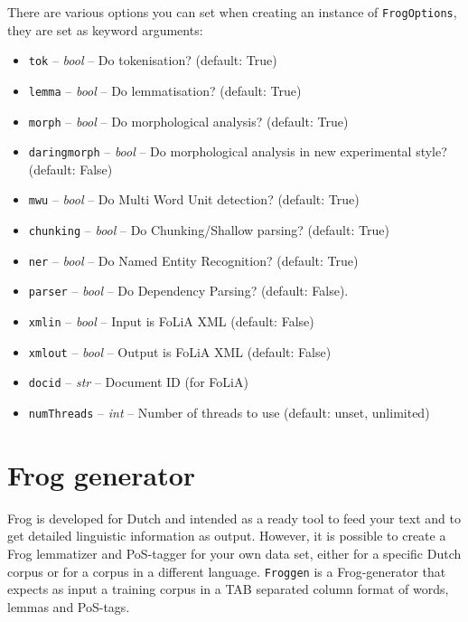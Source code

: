 \documentclass{book}
\begin{document}
There are various options you can set when creating an instance of \texttt{FrogOptions}, they are set as keyword arguments:

\begin{itemize}
	\item \texttt{tok} -- \emph{bool} -- Do tokenisation? (default: True)
	\item \texttt{lemma} -- \emph{bool} -- Do lemmatisation? (default: True)
	\item \texttt{morph} -- \emph{bool} -- Do morphological analysis? (default: True)
	\item \texttt{daringmorph} -- \emph{bool} -- Do morphological analysis in new experimental style? (default: False)
	\item \texttt{mwu} -- \emph{bool} -- Do Multi Word Unit detection? (default: True)
	\item \texttt{chunking} -- \emph{bool} -- Do Chunking/Shallow parsing? (default: True)
	\item \texttt{ner} -- \emph{bool} -- Do Named Entity Recognition? (default: True)
	\item \texttt{parser} -- \emph{bool} -- Do Dependency Parsing? (default: False).
	\item \texttt{xmlin} -- \emph{bool} -- Input is FoLiA XML (default: False)
	\item \texttt{xmlout} -- \emph{bool} -- Output is FoLiA XML (default: False)
	\item \texttt{docid} -- \emph{str} -- Document ID (for FoLiA)
	\item \texttt{numThreads} -- \emph{int} -- Number of threads to use (default: unset, unlimited)
\end{itemize}


\section{Frog generator}

Frog is developed for Dutch and intended as a ready tool to feed your text and to get detailed linguistic information as output.
However, it is possible to create a Frog lemmatizer and PoS-tagger for your own
data set, either for a specific Dutch corpus or for a corpus in a different language. {\tt Froggen} is a Frog-generator that expects as input a training corpus in a TAB separated column format of words, lemmas and PoS-tags.
\end{document}
